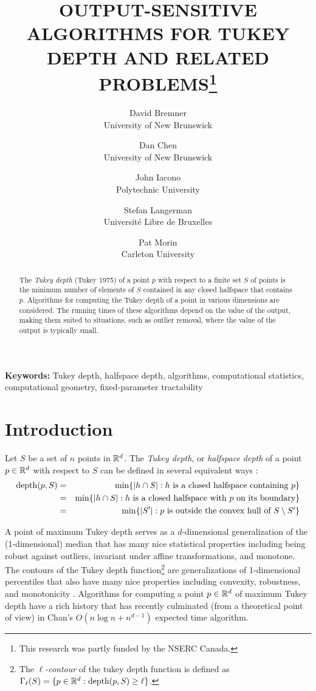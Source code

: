 \documentclass[charterfonts,lotsofwhite]{patmorin}
\title{\MakeUppercase{Output-Sensitive Algorithms for Tukey Depth and
        Related Problems}\thanks{This research was partly funded by
	the NSERC Canada.}}
\author{David Bremner \\ University of New Brunswick \and
        Dan Chen \\ University of New Brunswick \and
	John Iacono \\ Polytechnic University \and
	Stefan Langerman \\ Universit\'e Libre de Bruxelles \and
	Pat Morin \\ Carleton University}
\date{}
\DeclareMathOperator{\td}{depth}
\begin{document}
\maketitle

\begin{abstract}
The \emph{Tukey depth} (Tukey 1975) of a point $p$ with respect to a
finite set $S$ of points is the minimum number of elements of $S$
contained in any closed halfspace that contains $p$.  Algorithms for
computing the Tukey depth of a point in various dimensions are
considered. The running times of these algorithms depend on the value
of the output, making them suited to situations, such as outlier
removal, where the value of the output is typically small.
\end{abstract}

\noindent\textbf{Keywords:}
Tukey depth, halfspace depth, algorithms, computational statistics, 
computational geometry, fixed-parameter tractability

\section{Introduction}

Let $S$ be a set of $n$ points in $\mathbb{R}^d$.
The \emph{Tukey depth}, or \emph{halfspace depth} of a point $p\in\mathbb{R}^d$ with
respect to $S$ can be defined in several equivalent ways \cite{t75}:
\begin{eqnarray}
\td(p,S) & = & \min\{ |h\cap S| :
	             \mbox{$h$ is a closed halfspace containing $p$} \} 
                       \eqlabel{tuk-orig} \\ 
            & = & \min\{ |h\cap S| :
                      \mbox{$h$ is a closed halfspace 
                            with $p$ on its boundary} \} 
                        \eqlabel{tuk-boundary} \\ 
            & = & \min\{ |S'| :
                      \mbox{$p$ is outside the convex hull of 
                           $S\setminus S'$} \}
                      \eqlabel{tuk-hull}
\end{eqnarray}

A point of maximum Tukey depth serves as a $d$-dimensional
generalization of the (1-dimensional) median that has many nice
statistical properties including being robust against outliers,
invariant under affine transformations, and monotone.  The contours of
the Tukey depth function\footnote{The \emph{$\ell$-contour} of the
tukey depth function is defined as $\Gamma_\ell(S)=\{p\in\R^d :
\td(p,S)\ge \ell\}$.}  are generalizations of 1-dimensional
percentiles that also have many nice properties including convexity,
robustness, and monotonicity \cite{rr98,rr96,s90}.  Algorithms for
computing a point $p\in\mathbb{R}^d$ of maximum Tukey depth have a rich
history \cite{m91,ls03,c04} that has recently culminated (from a
theoretical point of view) in Chan's $O(n\log n + n^{d-1})$ expected
time algorithm.  
\end{document}

